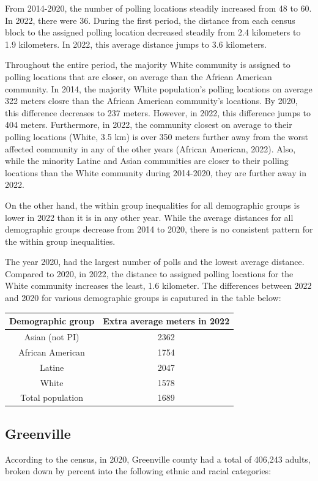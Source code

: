 \documentclass[11pt]{article}
\theoremstyle{remark}
\theoremstyle{definition}
\begin{document}
From 2014-2020, the number of polling locations steadily increased from 48 to 60. In 2022, there were 36. During the first period, the distance from each census block to the assigned polling location decreased steadily from 2.4 kilometers to 1.9 kilometers. In 2022, this average distance jumps to 3.6 kilometers. 

Throughout the entire period, the majority White community is assigned to polling locations that are closer, on average than the African American community. In 2014, the majority White population's polling locations on average 322 meters closre than the African American community's locations. By 2020, this difference decreases to 237 meters. However, in 2022, this difference jumps to 404 meters. Furthermore, in 2022, the community closest on average to their polling locations (White, 3.5 km) is over 350 meters further away from the worst affected community in any of the other years (African American, 2022). Also, while the minority Latine and Asian communities are closer to their polling locations than the White community during 2014-2020, they are further away in 2022.

On the other hand, the within group inequalities for all demographic groups is lower in 2022 than it is in any other year. While the average distances for all demographic groups decrease from 2014 to 2020, there is no consistent pattern for the within group inequalities.

The year 2020, had the largest number of polls and the lowest average distance. Compared to 2020, in 2022, the distance to assigned polling locations for the White community increases the least, 1.6 kilometer. The differences between 2022 and 2020 for various demographic groups is caputured in the table below:

\begin{tabular}{|c|c|}
	\hline
	Demographic group & Extra average meters in 2022 \\ \hline
	Asian (not PI) &   2362 \\ \hline
	African American &   1754  \\ \hline
	Latine & 2047 \\ \hline
	White &  1578\\ \hline
	Total population &  1689\\ \hline
\end{tabular}


\subsection{Greenville \label{sec:Greenville distances}}
According to the census, in 2020, Greenville county had a total of 406,243 adults, broken down by percent into the following ethnic and racial categories:
\end{document}
